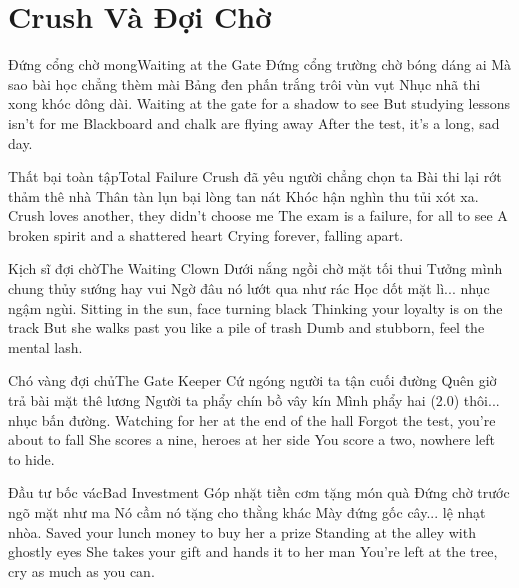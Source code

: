 \chapter{Crush Và Đợi Chờ}

\begin{tutuyetbox}{Đứng cổng chờ mong}{Waiting at the Gate}
Đứng cổng trường chờ bóng dáng ai
Mà sao bài học chẳng thèm mài
Bảng đen phấn trắng trôi vùn vụt
Nhục nhã thi xong khóc dông dài.
\tcblower
Waiting at the gate for a shadow to see 
But studying lessons isn't for me 
Blackboard and chalk are flying away 
After the test, it's a long, sad day.
\end{tutuyetbox}

\begin{tutuyetbox}{Thất bại toàn tập}{Total Failure}
Crush đã yêu người chẳng chọn ta
Bài thi lại rớt thảm thê nhà
Thân tàn lụn bại lòng tan nát
Khóc hận nghìn thu tủi xót xa.
\tcblower
Crush loves another, they didn't choose me 
The exam is a failure, for all to see 
A broken spirit and a shattered heart 
Crying forever, falling apart.
\end{tutuyetbox}

\begin{tutuyetbox}{Kịch sĩ đợi chờ}{The Waiting Clown}
Dưới nắng ngồi chờ mặt tối thui
Tưởng mình chung thủy sướng hay vui
Ngờ đâu nó lướt qua như rác
Học dốt mặt lì... nhục ngậm ngùi.
\tcblower
Sitting in the sun, face turning black
Thinking your loyalty is on the track
But she walks past you like a pile of trash
Dumb and stubborn, feel the mental lash.
\end{tutuyetbox}

\begin{tutuyetbox}{Chó vàng đợi chủ}{The Gate Keeper}
Cứ ngóng người ta tận cuối đường
Quên giờ trả bài mặt thê lương
Người ta phẩy chín bồ vây kín
Mình phẩy hai (2.0) thôi... nhục bấn đường.
\tcblower
Watching for her at the end of the hall
Forgot the test, you're about to fall
She scores a nine, heroes at her side
You score a two, nowhere left to hide.
\end{tutuyetbox}

\begin{tutuyetbox}{Đầu tư bốc vác}{Bad Investment}
Góp nhặt tiền cơm tặng món quà
Đứng chờ trước ngõ mặt như ma
Nó cầm nó tặng cho thằng khác
Mày đứng gốc cây... lệ nhạt nhòa.
\tcblower
Saved your lunch money to buy her a prize
Standing at the alley with ghostly eyes
She takes your gift and hands it to her man
You're left at the tree, cry as much as you can.
\end{tutuyetbox}


